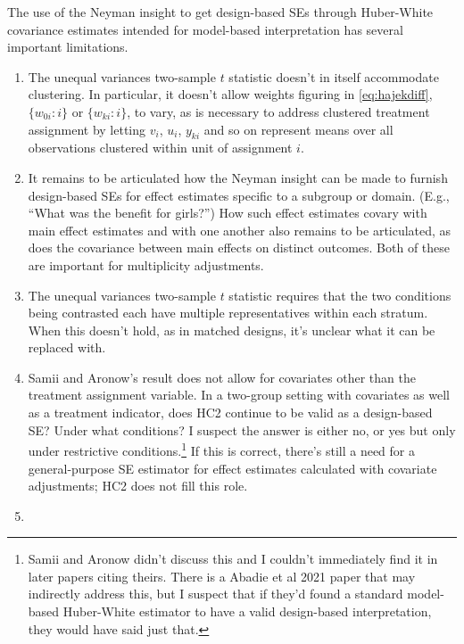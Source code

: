 The use of the Neyman insight to get design-based SEs through
Huber-White covariance estimates intended for model-based interpretation
has several important limitations.

\begin{enumerate}
\def\labelenumi{\arabic{enumi}.}
\item \label{it:prob-noweights}
  The unequal variances two-sample \(t\) statistic doesn't in itself accommodate
  clustering.  In particular, it doesn't allow weights figuring in \eqref{eq:hajekdiff},
$\{w_{0i} :i\}$ or  $\{w_{ki} :i\}$, to vary, as is necessary
to address clustered treatment assignment by letting $v_{i}$, $u_{i}$,
$y_{ki}$ and so on
represent means over all observations clustered within unit of
assignment $i$.
\item \label{it:moderators-multiple-outcomes}  It remains to be
  articulated how the Neyman insight can be made to furnish design-based SEs
  for effect estimates specific to a subgroup or domain. (E.g., ``What was
  the benefit for girls?'') How such
  effect estimates covary with main effect
  estimates and with one another also remains to be articulated, as
  does the covariance between main effects on distinct outcomes. Both
  of these are important for multiplicity adjustments.
\item \label{it:prob-multreps}
  The unequal variances two-sample \(t\) statistic requires that the two
  conditions being contrasted each have multiple representatives within
  each stratum. When this doesn't hold, as in matched designs, it's
  unclear what it can be replaced with.
\item \label{it:prob-covars}
  Samii and Aronow's result does not allow for covariates other than the
  treatment assignment variable. In a two-group setting with covariates
  as well as a treatment indicator, does HC2 continue to be valid as a
  design-based SE? Under what conditions? I suspect the answer is either
  no, or yes but only under restrictive conditions.\footnote{Samii and
    Aronow didn't discuss this and I couldn't immediately find it in
    later papers citing theirs. There is a Abadie et al 2021 paper that
    may indirectly address this, but I suspect that if they'd found a
    standard model-based Huber-White estimator to have a valid
    design-based interpretation, they would have said just that.}
  If this is correct,  there's still a need for a general-purpose SE
  estimator for effect estimates calculated with
covariate adjustments; HC2 does not fill this role.
\item \label{it:prob-differentstatuses}

\end{enumerate}
